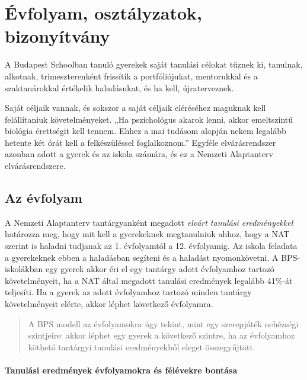 \hypertarget{evfolyam-osztalyzatok-bizonyitvany}{%
\section{Évfolyam, osztályzatok,
bizonyítvány}\label{evfolyam-osztalyzatok-bizonyitvany}}

A Budapest Schoolban tanuló gyerekek saját tanulási célokat tűznek ki,
tanulnak, alkotnak, trimeszterenként frissítik a portfóliójukat,
mentorukkal és a szaktanárokkal értékelik haladásukat, és ha kell,
újraterveznek.

Saját céljaik vannak, és sokszor a saját céljaik eléréséhez maguknak
kell felállítaniuk követelményeket. „Ha pszichológus akarok lenni, akkor
emeltszintű biológia érettségit kell tennem. Ehhez a mai tudásom alapján
nekem legalább hetente két órát kell a felkészüléssel foglalkoznom.''
Egyféle elvárásrendszer azonban adott a gyerek és az iskola számára, és
ez a Nemzeti Alaptanterv elvárásrendszere.

\hypertarget{evfolyam}{%
\subsection{Az évfolyam}\label{evfolyam}}

A Nemzeti Alaptanterv tantárgyanként megadott \emph{elvárt tanulási
eredményekkel} határozza meg, hogy mit kell a gyerekeknek megtanulniuk
ahhoz, hogy a NAT szerint is haladni tudjanak az 1. évfolyamtól a 12.
évfolyamig. Az iskola feladata a gyerekeknek ebben a haladásban segíteni
és a haladást nyomonkövetni. A BPS-iskolákban egy gyerek akkor éri el
egy tantárgy adott évfolyamhoz tartozó követelményeit, ha a NAT által
megadott tanulási eredmények legalább 41\%-át teljesíti. Ha a gyerek
az adott évfolyamhoz tartozó minden tantárgy követelményeit elérte,
akkor léphet következő évfolyamra.

\begin{quote}
A BPS modell az évfolyamokra úgy tekint, mint egy
{szerepjáték
nehézségi szintjeire}: akkor léphet egy gyerek a következő szintre, ha
az évfolyamhoz köthető tantárgyi tanulási eredményekből eleget
összegyűjtött.
\end{quote}

\hypertarget{tanulasi-eredmenyek-evfolyamokra-es-felevekre-bontasa}{%
\paragraph{Tanulási eredmények évfolyamokra és félévekre
bontása}\label{tanulasi-eredmenyek-evfolyamokra-es-felevekre-bontasa}}

